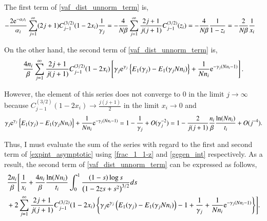 \documentclass{article}
\begin{document}
The first term of \eqref{vaf_dist_unnorm_term} is,
\begin{align}
 - \frac{2\mathrm{e}^{-\alpha_i t_i}}{\alpha_i} \sum_{j=1}^{\infty} (2j+1) C^{(3/2)}_{j-1} (1-2x_i) \frac{1}{\gamma_j} & = - \frac{4}{N\beta} \sum_{j=1}^{\infty}\frac{2j+1}{j(j+1)} C^{(3/2)}_{j-1} (z_i)
 = - \frac{4}{N\beta} \frac{1}{1-z_i}
 = - \frac{2}{N\beta} \frac{1}{x_i}\label{first_term}
\end{align}

On the other hand, the second term of \eqref{vaf_dist_unnorm_term} is,
\begin{align}
 \frac{4n_i}{\beta} \sum_{j=1}^{\infty} \frac{2j+1}{j(j+1)} C^{(3/2)}_{j-1} (1-2x_i) \left[ \gamma_j \mathrm{e}^{\gamma_j} \left\{ E_1(\gamma_j) - E_1(\gamma_j Nn_i) \right\} + \frac{1}{Nn_i} \mathrm{e}^{-\gamma_j (Nn_i - 1)} \right].
\end{align}

However, the element of this series does not converge to $0$ in the limit $j \to \infty$
because $C^{(3/2)}_{j-1} (1 - 2x_i)\to \frac{j(j+1)}{2}$ in the limit $x_i \to 0$ and
\begin{align}
 \gamma_j \mathrm{e}^{\gamma_j} \left\{ E_1(\gamma_j) - E_1(\gamma_j Nn_i) \right\} + \frac{1}{Nn_i} \mathrm{e}^{-\gamma_j (Nn_i - 1)} = 1 - \frac{1}{\gamma_j} + O(\gamma_j^{-2})
 = 1 - \frac{2}{j(j+1)} \frac{n_i}{\beta} \frac{\ln (Nn_i)}{t_i} + O(j^{-4}).\label{expint_asymptotic}
\end{align}

Thus, I must evaluate the sum of the series with regard to the first and second term of \eqref{expint_asymptotic} using \eqref{frac_1_1-z} and \eqref{gegen_int} respectively.
As a result, the second term of \eqref{vaf_dist_unnorm_term} can be expressed as follows,
\begin{align}
& \frac{2n_i}{\beta} \Biggl[ \frac{1}{x_i} + \frac{4n_i}{\beta}\frac{\ln(Nn_i)}{t_i} \int_{0}^{1} \frac{(1 - s) \log s}{ \left(1 -2zs + s^2 \right)^{3/2}} ds\nonumber\\
 & + 2 \sum_{j=1}^{\infty} \frac{2j+1}{j(j+1)} C^{(3/2)}_{j-1} (1-2x_i) \left\{ \gamma_j \mathrm{e}^{\gamma_j} \left( E_1(\gamma_j) - E_1(\gamma_j Nn_i) \right) -1 + \frac{1}{\gamma_j} + \frac{1}{Nn_i} \mathrm{e}^{-\gamma_j (Nn_i - 1)} \right\} \Biggr].\label{second_term}
\end{align}
\end{document}
